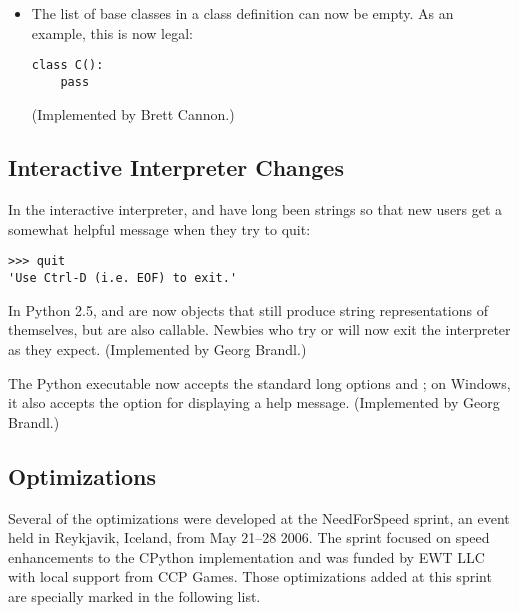 \documentclass{howto}
\begin{document}
\begin{itemize}
\item The list of base classes in a class definition can now be empty.  
As an example, this is now legal:

\begin{verbatim}
class C():
    pass
\end{verbatim}
(Implemented by Brett Cannon.)

\end{itemize}


\subsection{Interactive Interpreter Changes\label{interactive}}

In the interactive interpreter,  and  
have long been strings so that new users get a somewhat helpful message
when they try to quit:

\begin{verbatim}
>>> quit
'Use Ctrl-D (i.e. EOF) to exit.'
\end{verbatim}

In Python 2.5,  and  are now objects that still
produce string representations of themselves, but are also callable.
Newbies who try  or  will now exit the
interpreter as they expect.  (Implemented by Georg Brandl.)

The Python executable now accepts the standard long options 
 and ; on Windows, 
it also accepts the  option for displaying a help message.
(Implemented by Georg Brandl.)


\subsection{Optimizations\label{opts}}

Several of the optimizations were developed at the NeedForSpeed
sprint, an event held in Reykjavik, Iceland, from May 21--28 2006.
The sprint focused on speed enhancements to the CPython implementation
and was funded by EWT LLC with local support from CCP Games.  Those
optimizations added at this sprint are specially marked in the
following list.
\end{document}
